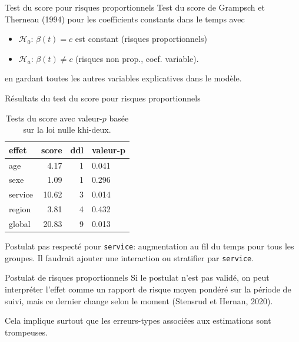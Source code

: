 \documentclass[
  ignorenonframetext,
]{beamer}
\providecommand{\tightlist}{%
  \setlength{\itemsep}{0pt}\setlength{\parskip}{0pt}}
\begin{document}
\begin{frame}{Test du score pour risques proportionnels}
\protect{}\label{test-du-score-pour-risques-proportionnels}
Test du score de Grampsch et Therneau (1994) pour les coefficients
constants dans le temps avec

\begin{itemize}
\tightlist
\item
  \(\mathscr{H}_0\): \(\beta(t)=c\) est constant (risques
  proportionnels)
\item
  \(\mathscr{H}_a\): \(\beta(t) \neq c\) (risques non prop., coef.
  variable).
\end{itemize}

en gardant toutes les autres variables explicatives dans le modèle.
\end{frame}

\begin{frame}[fragile]{Résultats du test du score pour risques
proportionnels}
\protect{}\label{ruxe9sultats-du-test-du-score-pour-risques-proportionnels}
\begin{longtable}[t]{lrrl}

\caption{\label{tbl-coxph-hypothese}Tests du score avec valeur-\(p\)
basée sur la loi nulle khi-deux.}

\tabularnewline

\toprule
effet & score & ddl & valeur-p\\
\midrule
age & 4.17 & 1 & 0.041\\
sexe & 1.09 & 1 & 0.296\\
service & 10.62 & 3 & 0.014\\
region & 3.81 & 4 & 0.432\\
global & 20.83 & 9 & 0.013\\
\bottomrule

\end{longtable}

Postulat pas respecté pour \texttt{service}: augmentation au fil du
temps pour tous les groupes. Il faudrait ajouter une interaction ou
stratifier par \texttt{service}.
\end{frame}

\begin{frame}{Postulat de risques proportionnels}
\protect{}\label{postulat-de-risques-proportionnels-1}
Si le postulat n'est pas validé, on peut interpréter l'effet comme un
rapport de risque moyen pondéré sur la période de suivi, mais ce dernier
change selon le moment (Stensrud et Hernan, 2020).

Cela implique surtout que les erreurs-types associées aux estimations
sont trompeuses.
\end{frame}
\end{document}
